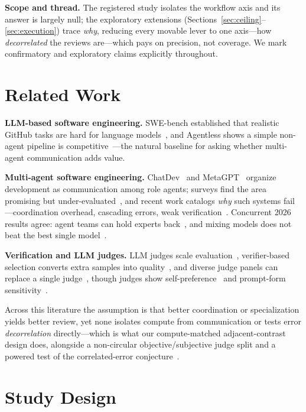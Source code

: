 \documentclass[conference]{IEEEtran}
\begin{document}
\textbf{Scope and thread.} The registered study isolates the workflow axis and
its answer is largely null; the exploratory extensions
(Sections~\ref{sec:ceiling}--\ref{sec:execution}) trace \emph{why}, reducing
every movable lever to one axis---how \emph{decorrelated} the reviews are---which
pays on precision, not coverage. We mark confirmatory and exploratory claims
explicitly throughout.

\section{Related Work}

\textbf{LLM-based software engineering.} SWE-bench established that realistic
GitHub tasks are hard for language models~\cite{swebench}, and Agentless shows a
simple non-agent pipeline is competitive~\cite{agentless}---the natural baseline
for asking whether multi-agent communication adds value.

\textbf{Multi-agent software engineering.} ChatDev~\cite{chatdev} and
MetaGPT~\cite{metagpt} organize development as communication among role agents;
surveys find the area promising but under-evaluated~\cite{survey}, and recent
work catalogs \emph{why} such systems fail---coordination overhead, cascading
errors, weak verification~\cite{whyfail}. Concurrent 2026 results agree: agent
teams can hold experts back~\cite{pappu}, and mixing models does not beat the
best single model~\cite{selfmoa}.

\textbf{Verification and LLM judges.} LLM judges scale
evaluation~\cite{llmjudge}, verifier-based selection converts extra samples into
quality~\cite{cobbe}, and diverse judge panels can replace a single
judge~\cite{verga}, though judges show self-preference~\cite{panickssery} and
prompt-form sensitivity~\cite{sclar}.

Across this literature the assumption is that better coordination or
specialization yields better review, yet none isolates compute from communication
or tests error \emph{decorrelation} directly---which is what our compute-matched
adjacent-contrast design does, alongside a non-circular objective/subjective judge
split and a powered test of the correlated-error conjecture~\cite{zietsman}.

\section{Study Design}
\end{document}
